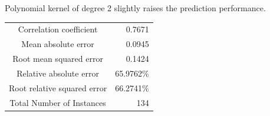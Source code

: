 Polynomial kernel of degree 2 slightly raises the prediction performance.

\begin{table}[ht]
\begin{center}
\begin{tabular}{ c r }
Correlation coefficient        &          0.7671 \\
Mean absolute error            &          0.0945 \\
Root mean squared error        &          0.1424 \\
Relative absolute error        &         65.9762\% \\
Root relative squared error    &         66.2741\% \\
Total Number of Instances      &        134 \\
\end{tabular}
\end{center}
\end{table}

